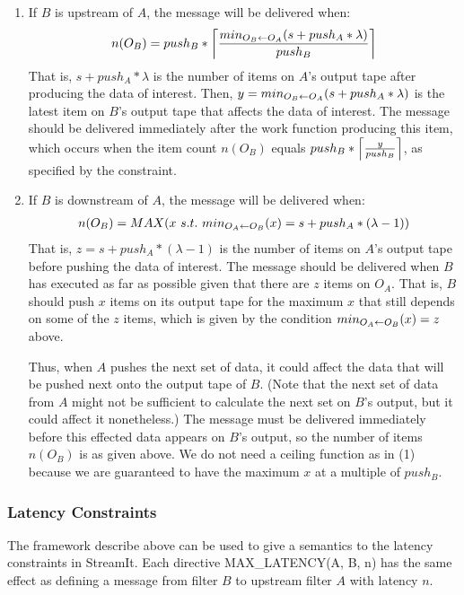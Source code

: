 \begin{enumerate}

\item If $B$ is upstream of $A$, the message will be delivered when:
\begin{align}
\label{eq:msgup}
n(O_B) = push_B * \left\lceil\frac{min_{O_B \leftarrow O_A}(s + push_A * \lambda)}{push_B}\right\rceil
\end{align}
That is, $s + push_A * \lambda$ is the number of items on $A$'s output
tape after producing the data of interest.  Then, $y = min_{O_B \leftarrow O_A}(s
+ push_A * \lambda)$ is the latest item on $B$'s output tape that
affects the data of interest.  The message should be delivered
immediately after the work function producing this item, which occurs
when the item count $n(O_B)$ equals $push_B * \left\lceil\frac{y}{push_B}\right\rceil$, as
specified by the constraint.

\item If $B$ is downstream of $A$, the message will be delivered when:
\begin{align}
\label{eq:msgdown}
n(O_B) = MAX(x~s.t.~min_{O_A \leftarrow O_B}(x) = s + push_A * (\lambda-1))
\end{align}
That is, $z = s + push_A * (\lambda - 1)$ is the number of items on
$A$'s output tape before pushing the data of interest.  The message
should be delivered when $B$ has executed as far as possible given
that there are $z$ items on $O_A$.  That is, $B$ should push $x$ items
on its output tape for the maximum $x$ that still depends on some of
the $z$ items, which is given by the condition $min_{O_A \leftarrow O_B}(x) = z$
above.

Thus, when $A$ pushes the next set of data, it could affect the data
that will be pushed next onto the output tape of $B$.  (Note that the
next set of data from $A$ might not be sufficient to calculate the
next set on $B$'s output, but it could affect it nonetheless.)  The
message must be delivered immediately before this effected data
appears on $B$'s output, so the number of items $n(O_B)$ is as given
above.  We do not need a ceiling function as in (1) because we are
guaranteed to have the maximum $x$ at a multiple of $push_B$.

\end{enumerate}

\subsubsection{Latency Constraints}

The framework describe above can be used to give a semantics to the
latency constraints in StreamIt.  Each directive MAX\_LATENCY(A, B, n)
has the same effect as defining a message from filter $B$ to upstream
filter $A$ with latency $n$.

